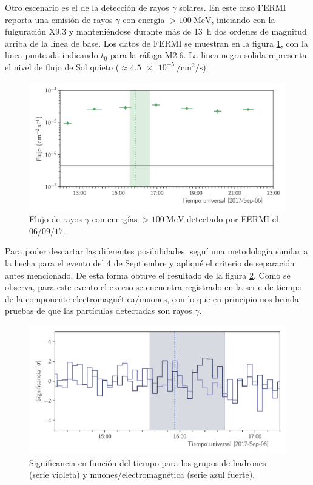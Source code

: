 Otro escenario es el de la detección de rayos $\gamma$ solares. En este caso FERMI reporta una emisión de rayos $\gamma$ con energía $>\SI{100}{\mega\electronvolt}$, iniciando con la fulguración X\num{9.3} y manteniéndose durante más de \SI{13}{\hour} dos ordenes de magnitud arriba de la línea de base. Los datos de FERMI se muestran en la figura \ref{fig:september-06-gammas}, con la linea punteada indicando $t_{0}$ para la ráfaga M\num{2.6}. La linea negra solida representa el nivel de flujo de Sol quieto ($\approx\SI{4.5e-5}{\per\square\cm\per\second}$).

\begin{figure}
        \centering
        \includegraphics[width=\textwidth]{gammas-170906.pdf}
        \caption{Flujo de rayos $\gamma$ con energías $>\SI{100}{\mega\electronvolt}$ detectado por FERMI el $06/09/17$.}
        \label{fig:september-06-gammas}
\end{figure}

Para poder descartar las diferentes posibilidades, seguí una metodología similar a la hecha para el evento del \num{4} de Septiembre y apliqué el criterio de separación antes mencionado. De esta forma obtuve el resultado de la figura \ref{fig:september-06-disc}. Como se observa, para este evento el exceso se encuentra registrado en la serie de tiempo de la componente electromagnética/muones, con lo que en principio nos brinda pruebas de que las partículas detectadas son rayos $\gamma$.

\begin{figure}
        \centering
        \includegraphics[width=\textwidth]{significance-170906.pdf}
        \caption{Significancia en función del tiempo para los grupos de hadrones (serie violeta) y muones/electromagnética (serie azul fuerte).}
        \label{fig:september-06-disc}
\end{figure}

